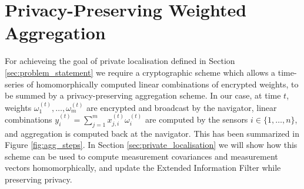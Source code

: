 \documentclass[twocolumn]{autart}
\theoremstyle{definition}
\begin{document}
\section{Privacy-Preserving Weighted Aggregation}
For achieveing the goal of private localisation defined in Section \ref{sec:problem_statement} we require a cryptographic scheme which allows a time-series of homomorphically computed linear combinations of encrypted weights, to be summed by a privacy-preserving aggregation scheme. In our case, at time $t$, weights $\omega_1^{(t)}, \dots , \omega_m^{(t)}$ are encrypted and broadcast by the navigator, linear combinations $y^{(t)}_i=\sum^m_{j=1}x_{j,i}^{(t)}\omega_i^{(t)}$ are computed by the sensors $i \in \{1, \dots ,n\}$, and aggregation is computed back at the navigator. This has been summarized in Figure \ref{fig:agg_steps}. In Section \ref{sec:private_localisation} we will show how this scheme can be used to compute measurement covariances and measurement vectors homomorphically, and update the Extended Information Filter while preserving privacy. 
\end{document}
